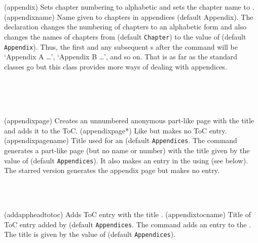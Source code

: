 \begin{syntax}
\cmd{\appendix} \\
\cmd{\appendixname} \\
\end{syntax}
\glossary(appendix)%
  {}%
  {Sets chapter numbering to alphabetic and sets the chapter name to 
   .}
\glossary(appendixname)%
  {}%
  {Name given to chapters in appendices (default Appendix).}
The \cmd{\appendix} declaration changes the numbering of
chapters to an alphabetic form and also changes 
the names of chapters from \cmd{\chaptername} (default \texttt{Chapter})
to the value of \cmd{\appendixname} (default \texttt{Appendix}). 
Thus, the first and any subsequent \cmd{\chapter}s after 
the \cmd{\appendix} command
will be `Appendix A \ldots', `Appendix B \ldots', and so on. 
That is as far as the standard classes go but this class provides more ways
of dealing with appendices.

\begin{syntax}
\cmd{\appendixpage}\\
\cmd{\appendixpage*}\\
\cmd{\appendixpagename}\\
\end{syntax}
\glossary(appendixpage)
  {}%
  {Creates an unnumbered anonymous  part-like page with the title  and adds it to the ToC.}
\glossary(appendixpage*)
  {}%
  {Like  but makes no ToC entry.}
\glossary(appendixpagename)
  {}%
  {Title used for an  (default \texttt{Appendices}.}
The \cmd{\appendixpage} command generates a part-like page (but no name 
or number) with the title given by the value of \cmd{\appendixpagename} 
(default \texttt{Appendices}). It also makes an entry in 
the \toc{} using 
\cmd{\addappheadtotoc} (see below). The starred version generates the 
appendix page but makes no \toc{} entry.

\begin{syntax}
\cmd{\addappheadtotoc}\\
\cmd{\appendixtocname}\\
\end{syntax}
\glossary(addappheadtotoc)%
  {}%
  {Adds ToC entry with the title .}
\glossary(appendixtocname)%
  {}%
  {Title of ToC entry added by  (default \texttt{Appendices}.}
The command \cmd{\addappheadtotoc} adds an entry to the \toc. The title is
given by the value of \cmd{\appendixtocname} (default \texttt{Appendices}).

